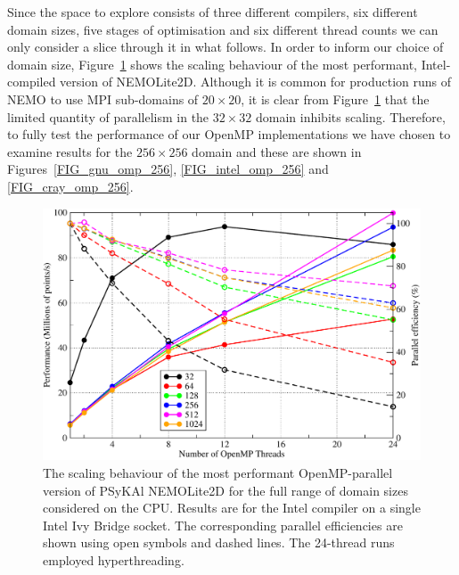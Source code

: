 \documentclass[gmd, manuscript]{copernicus}
\newlength{\picwidth}
\begin{document}
Since the space to explore consists of three different compilers, six
different domain sizes, five stages of optimisation and six different
thread counts we can only consider a slice through it in what follows.
In order to inform our choice of domain size,
Figure~\ref{FIG_omp_domain_size} shows the scaling behaviour of the
most performant, Intel-compiled version of NEMOLite2D. Although it is
common for production runs of NEMO to use MPI sub-domains of $20
\times 20$, it is clear from Figure~\ref{FIG_omp_domain_size} that the
limited quantity of parallelism in the $32 \times 32$ domain inhibits
scaling. Therefore, to fully test the performance of our OpenMP
implementations we have chosen to examine results for the $256 \times
256$ domain and these are shown in Figures~\ref{FIG_gnu_omp_256},
\ref{FIG_intel_omp_256} and \ref{FIG_cray_omp_256}.

\begin{figure}
\centering
\includegraphics[width=\picwidth]{omp_scaling_problem_size}
\caption{The scaling behaviour of the most performant OpenMP-parallel
  version of {PS}y{KA}l NEMOLite2D for the full range of domain sizes
  considered on the CPU. Results are for the Intel compiler on a
  single Intel Ivy Bridge socket. The corresponding parallel
  efficiencies are shown using open symbols and dashed lines. The
  24-thread runs employed hyperthreading.}
\label{FIG_omp_domain_size}
\end{figure}
\end{document}
